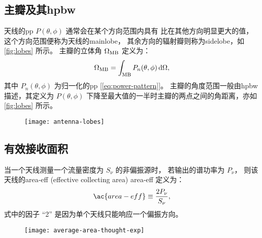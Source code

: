 \subsection{主瓣及其\acl*{hpbw}}

天线的\ac{pp} $P(\theta,\phi)$ 通常会在某个方向范围内具有
比在其他方向明显更大的值，
这个方向范围便称为天线的\acf{mainlobe}，
其余方向的辐射瓣则称为\acf{sidelobe}，如\autoref{fig:lobes} 所示。
主瓣的立体角 $\Omega_{\mathrm{MB}}$ 定义为：
\begin{equation}
  \label{eq:omega-mb}
  \Omega_{\mathrm{MB}} = \int_{\mathrm{MB}} P_n(\theta,\phi) \,\mathrm{d}\Omega ,
\end{equation}
其中 $P_n(\theta,\phi)$ 为归一化的\ac{pp} [\autoref{eq:power-pattern}]。
主瓣的角度范围一般由\acf{hpbw}描述，其定义为 $P(\theta,\phi)$
下降至最大值的一半时主瓣的两点之间的角距离，亦如\autoref{fig:lobes} 所示。

\begin{figure}[htp]
  \centering
  \texttt{[image: antenna-lobes]}
  \label{fig:lobes}
\end{figure}

\subsection{有效接收面积}

当一个天线测量一个流量密度为 $S_{\nu}$ 的非偏振源时，
若输出的谱功率为 $P_{\nu}$，
则该天线的\acl{area-eff} (effective collecting area) \ac{area-eff}
定义为：
\begin{equation}
  \label{eq:area-eff}
  \ac{area-eff} \equiv \frac{2 P_{\nu}}{S_{\nu}} ,
\end{equation}
式中的因子 \enquote{2} 是因为单个天线只能响应一个偏振方向。

\begin{figure}[htp]
  \centering
  \texttt{[image: average-area-thought-exp]}
  \label{fig:area-avg-exp}
\end{figure}

